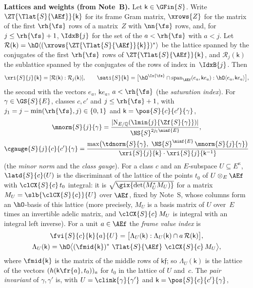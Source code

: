 \documentclass[11pt,a4paper]{article}
\newcommand{\Q}{\mathbb{Q}}
\newcommand{\m}[1]{\mbox{$#1$}}        %
\newcommand{\subhead}[1]{\par\addvspace{9pt plus 2pt}\Needspace{4\baselineskip}\noindent\textbf{#1}\enspace\ignorespaces}
\theoremstyle{plainx}
\theoremstyle{uprightx}
\renewcommand{\m}[1]{$#1$}
\newcommand{\sn}{\nn{\fs}}
\newcommand{\sro}{\rh{\fs}}
\newcommand{\fE}{\ninf{E}}
\newcommand{\Nn}{\NS{S}}
\newcommand{\Tl}{\Tlat{S}{\AEf}}
\newcommand{\Zl}[1]{\ZT{\Tl}{#1}}
\newcommand{\Nm}{\mathrm{N}_{E/\Q}}
\begin{document}
\subhead{Lattices and weights (from Note~B).} Let \m{\mathsf k\in\GFin{S}}. Write \m{\Zl{\mathsf k}} for its frame
Gram matrix, \m{\xrows{Z}} for the matrix of the first \m{\sro} rows of a matrix~$Z$ with \m{\sn} rows, and, for
\m{j\le\sro+1}, \m{\IdxB{j}} for the set of the \m{a<\sro} with \m{a<j}. Let
\m{\mathcal R(\mathsf k)=\hO\langle(\xrows{\Zl{\mathsf k}})^*\rangle} be the lattice spanned by the conjugates of
the first \m{\sro} rows of \m{\Zl{\mathsf k}}, and \m{\mathcal R_j(\mathsf k)} the sublattice spanned by the conjugates of the
rows of index in~\m{\IdxB{j}}. Then
\[\xri{S}{j}{\mathsf k}=[\mathcal R(\mathsf k):\mathcal R_j(\mathsf k)],\qquad
\sati{S}{\mathsf k}=\bigl[\hO^{\Ix{\fs}}\cap\operatorname{span}_{\AEf}(e_a,\mathsf ke_a):\hO\langle e_a,\mathsf ke_a\rangle\bigr],\]
the second with the vectors \m{e_a}, \m{\mathsf ke_a}, \m{a<\sro} (the \emph{saturation index}). For
\m{\gamma\in\GS{S}{E}}, classes \m{c,c'} and \m{j\le\sro+1}, with \m{j_1=j-\min(\sro,j)\in\{0,1\}} and
\m{\mathsf k=\pos{S}{c}{c'}{\gamma}},
\begin{gather*}\mnorm{S}{j}{\gamma}=\frac{|\Nm(\lmin{j}{\Zf{S}{\gamma}})|}{\Nn^{2j_1\fE}},\\
\cgauge{S}{j}{c}{c'}{\gamma}=\frac{\max\bigl(\tdnorm{S}{\gamma},\ \Nn^{\fE}\,\mnorm{S}{j}{\gamma}\bigr)}
{\xri{S}{j}{\mathsf k}\cdot\xri{S}{j}{\mathsf k^{-1}}}\end{gather*}
(the \emph{minor norm} and the \emph{class gauge}). For a class $c$ and an $E$-subspace \m{U\subseteq E^\kappa},
\m{\latd{S}{c}(U)} is the discriminant of the lattice of the points $t_0$ of \m{U\otimes_E\AEf} with
\m{\clCX{S}{c}\,t_0} integral: it is \m{\sqrt{\gix{\det(M_U^*M_U)}}} for a matrix
\m{M_U=\slb{\clCX{S}{c}}{U}} over \m{\AEf}, fixed by Note~S, whose columns form an \m{\hO}-basis of this lattice
(more precisely, $M_U$ is a basis matrix of $U$ over~$E$ times an invertible adelic matrix, and
\m{\clCX{S}{c}\,M_U} is integral with an integral left inverse). For a unit \m{a\in\AEf} the \emph{frame value
index} is
\begin{gather*}\fvi{S}{c}{\mathsf k}{a}{U}=\bigl[\Lambda_U(\mathsf k):\Lambda_U(\mathsf k)\cap a\,\mathcal R(\mathsf k)\bigr],\\
\Lambda_U(\mathsf k)=\hO\bigl\langle(\fmid{\mathsf k})^*\ \Tl\ \clCX{S}{c}\,M_U\bigr\rangle,\end{gather*}
where \m{\fmid{\mathsf k}} is the matrix of the middle rows of \m{\mathsf k\mathfrak f}; so \m{\Lambda_U(\mathsf k)} is
the lattice of the vectors \m{(h(\mathsf k\fr{a},t_0))_{a}} for $t_0$ in the lattice of $U$ and~$c$. The \emph{pair
invariant} of \m{\gamma,\gamma'} is, with \m{U=\clink{\gamma}{\gamma'}} and \m{\mathsf k=\pos{S}{c}{c'}{\gamma}},
\end{document}
